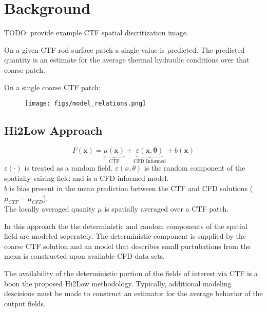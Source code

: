 

\section{Background}

TODO: provide example CTF spatial discritization image.

On a given CTF rod surface patch a single value is predicted.  The predicted quantity is an estimate for the average thermal hydraulic conditions over that coarse patch.

On a single coarse CTF patch:
\begin{figure}[!htbp]
\centering
\texttt{[image: figs/model\_relations.png]}
\label{model_overview}
\end{figure}

\subsection{Hi2Low Approach}
\begin{equation}
    F(\mathbf x) = \underbrace{\mu(\mathbf{x})}_\text{CTF} + \underbrace{\varepsilon(\mathbf{x, \theta})}_\text{CFD Informed} + b(\mathbf{x})
\end{equation}
 $ \varepsilon(\cdot) $ is treated as a random field.  $\varepsilon(x, \theta)$ is the random component of the spatially vairing field and is a CFD informed model. \\
$b$ is bias present in the mean prediction between the CTF and CFD solutions ($\mu_{CTF} - \mu_{CFD}$). \\
The locally averaged quanity $\mu$ is spatially averaged over a CTF patch.

In this approach the the deterministic and random components of the spatial field are modeled seperately.  The deterministic component is supplied by the coarse CTF solution and an model that describes small purtubations from the mean is constructed upon available CFD data sets.

The availability of the deterministic portion of the fields of interest via CTF is a boon the proposed Hi2Low methodology.  Typically, additional modeling descisions must be made to construct an estimator for the average behavior of the output fields.
